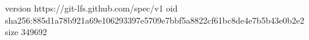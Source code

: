 version https://git-lfs.github.com/spec/v1
oid sha256:885d1a78b921a69e106293397e5709e7bbf5a8822cf61bc8de4e7b5b43e0b2e2
size 349692
